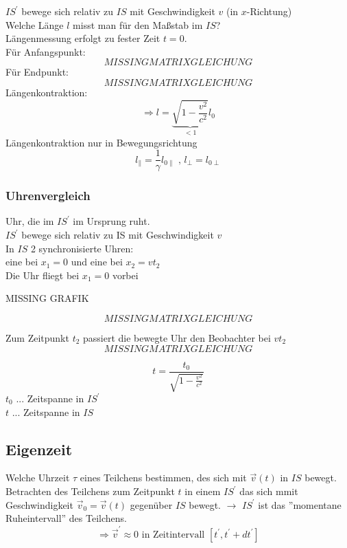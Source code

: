 \documentclass[a4paper, 11pt]{article}
\numberwithin{equation}{section}
\begin{document}
$IS^\prime$ bewege sich relativ zu $IS$ mit Geschwindigkeit $v$ (in $x$-Richtung)\\
Welche Länge $l$ misst man für den Maßstab im $IS$? \\
Längenmessung erfolgt zu fester Zeit $t=0$.\\
Für Anfangspunkt:
\begin{equation*}
MISSING MATRIXGLEICHUNG
\end{equation*}
Für Endpunkt:
\begin{equation*}
MISSING MATRIXGLEICHUNG
\end{equation*}
Längenkontraktion:
\begin{equation}
\Rightarrow \boxed{l = \underbrace{\sqrt{1-\frac{v^2}{c^2}}}_{<1} l_0}
\end{equation}
Längenkontraktion nur in Bewegungsrichtung
\begin{equation}
l_\parallel = \dfrac{1}{\gamma} l_{0\parallel} \text{ , } l_\perp = l_{0 \perp}
\end{equation}


\subsubsection*{Uhrenvergleich}
Uhr, die im $IS^\prime$ im Ursprung ruht.\\
$IS^\prime$ bewege sich relativ zu IS mit Geschwindigkeit $v$\\
In $IS$ 2 synchronisierte Uhren:\\
eine bei $x_1=0$ und eine bei $x_2 = v t_2$\\
Die Uhr fliegt bei $x_1 = 0$ vorbei

MISSING GRAFIK

\begin{equation*}
MISSING MATRIXGLEICHUNG
\end{equation*}

Zum Zeitpunkt $t_2$ passiert die bewegte Uhr den Beobachter bei $vt_2$
\begin{equation*}
MISSING MATRIXGLEICHUNG
\end{equation*}

\begin{equation*}
\boxed{t= \dfrac{t_0}{\sqrt{1-\frac{v^2}{c^2}}}}
\end{equation*}
$t_0$ ... Zeitspanne in $IS^\prime$\\
$t$ ... Zeitspanne in $IS$


\subsection*{Eigenzeit}
Welche Uhrzeit  $\tau$ eines Teilchens bestimmen, des sich mit $\vec{v}(t)$ in $IS$ bewegt. Betrachten des Teilchens zum Zeitpunkt $t$ in einem $IS^\prime$ das sich mmit Geschwindigkeit $\vec{v}_0 = \vec{v}(t)$ gegenüber $IS$ bewegt. $\rightarrow$ $IS^\prime$ ist das ''momentane Ruheintervall'' des Teilchens.
\begin{equation*}
\Rightarrow \vec{v}^\prime \approx 0 \text{ in Zeitintervall } [t^\prime , t^\prime + dt^\prime]
\end{equation*}
\end{document}
